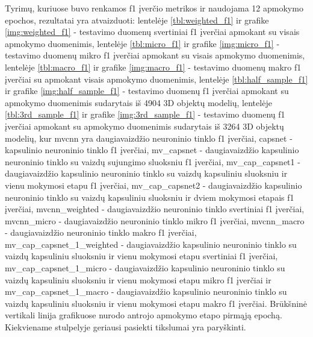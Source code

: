 Tyrimų, kuriuose buvo renkamos f1 įverčio metrikos ir naudojama 12 apmokymo epochos, rezultatai yra atvaizduoti: lentelėje \ref{tbl:weighted_f1} ir grafike \ref{img:weighted_f1} - testavimo duomenų svertiniai f1 įverčiai apmokant su visais apmokymo duomenimis, lentelėje \ref{tbl:micro_f1} ir grafike \ref{img:micro_f1} - testavimo duomenų mikro f1 įverčiai apmokant su visais apmokymo duomenimis, lentelėje \ref{tbl:macro_f1} ir grafike \ref{img:macro_f1} - testavimo duomenų makro f1 įverčiai su apmokant visais apmokymo duomenimis, lentelėje \ref{tbl:half_sample_f1} ir grafike \ref{img:half_sample_f1} - testavimo duomenų f1 įverčiai apmokant su apmokymo duomenimis sudarytais iš 4904 3D objektų modelių, lentelėje \ref{tbl:3rd_sample_f1} ir grafike \ref{img:3rd_sample_f1} - testavimo duomenų f1 įverčiai apmokant su apmokymo duomenimis sudarytais iš 3264 3D objektų modelių, kur
mvcnn yra daugiavaizdžio neuroninio tinklo f1 įverčiai, capsnet - kapsulinio neuroninio tinklo f1 įverčiai, mv\_capsnet - daugiavaizdžio kapsulinio neuroninio tinklo su vaizdų sujungimo sluoksniu f1 įverčiai, mv\_cap\_capsnet1 - daugiavaizdžio kapsulinio neuroninio tinklo su vaizdų kapsuliniu sluoksniu ir vienu mokymosi etapu f1 įverčiai, mv\_cap\_capsnet2 - daugiavaizdžio kapsulinio neuroninio tinklo su vaizdų kapsuliniu sluoksniu ir dviem mokymosi etapais f1 įverčiai, 
mvcnn\_weighted -  daugiavaizdžio neuroninio tinklo svertiniai f1 įverčiai, 
mvcnn\_micro -  daugiavaizdžio neuroninio tinklo mikro f1 įverčiai, 
mvcnn\_macro -  daugiavaizdžio neuroninio tinklo makro f1 įverčiai, 
mv\_cap\_capsnet\_1\_weighted - daugiavaizdžio kapsulinio neuroninio tinklo su vaizdų kapsuliniu sluoksniu ir vienu mokymosi etapu svertiniai f1 įverčiai, 
mv\_cap\_capsnet\_1\_micro - daugiavaizdžio kapsulinio neuroninio tinklo su vaizdų kapsuliniu sluoksniu ir vienu mokymosi etapu mikro f1 įverčiai ir
mv\_cap\_capsnet\_1\_macro - daugiavaizdžio kapsulinio neuroninio tinklo su vaizdų kapsuliniu sluoksniu ir vienu mokymosi etapu makro f1 įverčiai. 
Brūkšninė vertikali linija grafikuose nurodo antrojo apmokymo etapo pirmąją epochą. Kiekviename stulpelyje geriausi pasiekti tikslumai yra paryškinti.

